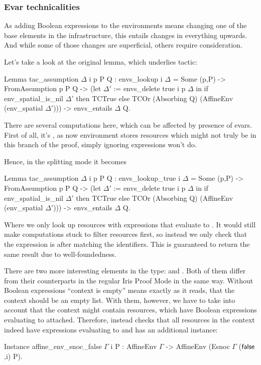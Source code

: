 \subsubsection{Evar technicalities}
\label{subsubsec:evar_technicalities}

As adding Boolean expressions to the environments means changing one of the base elements in the infrastructure, this entails changes in everything upwards.
And while some of those changes are superficial, others require consideration.

Let's take a look at the original  lemma, which underlies  tactic:
\begin{coq}
  Lemma tac_assumption $\Delta$ i p P Q :
  envs_lookup i $\Delta$ = Some (p,P) ->
  FromAssumption p P Q ->
  (let $\Delta'$ := envs_delete true i p $\Delta$ in
   if env_spatial_is_nil $\Delta'$ then TCTrue
   else TCOr (Absorbing Q) (AffineEnv (env_spatial $\Delta'$))) ->
  envs_entails $\Delta$ Q.
\end{coq}

There are several computations here, which can be affected by presence of evars.
First of all, it's , as now environment stores resources which might not truly be in this branch of the proof, simply ignoring expressions won't do.

Hence, in the splitting mode it becomes
\begin{coq}
Lemma tac_assumption $\Delta$ i p P Q :
  envs_lookup_true i $\Delta$ = Some (p,P) ->
  FromAssumption p P Q ->
  (let $\Delta'$ := envs_delete true i p $\Delta$ in
   if env_spatial_is_nil $\Delta'$ then TCTrue
   else TCOr (Absorbing Q) (AffineEnv (env_spatial $\Delta'$))) ->
  envs_entails $\Delta$ Q.
\end{coq}

Where we only look up resources with expressions that evaluate to \true.
It would still make computations stuck to filter resources first, so instead we only check that the expression is \true after matching the identifiers.
This is guaranteed to return the same result due to well-foundedness.

There are two more interesting elements in the type:  and .
Both of them differ from their counterparts in the regular Iris Proof Mode in the same way.
Without Boolean expressions ``context is empty'' means exactly as it reads, that the context should be an empty list.
With them, however, we have to take into account that the context might contain resources, which have Boolean expressions evaluating to \false attached.
Therefore,  instead checks that all resources in the context indeed have expressions evaluating to \false and  has an additional instance:
\begin{coq}
  Instance affine_env_snoc_false $\Gamma$ i P :
  AffineEnv $\Gamma$ -> AffineEnv (Esnoc $\Gamma$ ($\textsf{false}$,i) P).
\end{coq}


